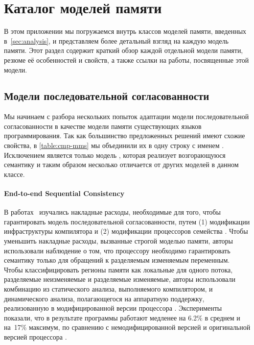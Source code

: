 \section{Каталог моделей памяти}
\label{sec:catalog}

В этом приложении мы погружаемся внутрь классов 
моделей памяти, введенных в~\cref{sec:analysis},
и представляем более детальный взгляд на каждую модель памяти.
Этот раздел содержит краткий обзор каждой отдельной модели памяти, 
резюме её особенностей и свойств, а также ссылки на работы, 
посвященные этой модели.   
 
\subsection{Модели последовательной согласованности}
\label{sec:catalog:sc}

Мы начинаем с разбора нескольких попыток 
адаптации модели последовательной согласованности 
в качестве модели памяти существующих языков программирования. 
Так как большинство предложенных решений имеют 
схожие свойства, в \cref{table:cmp-mms} 
мы объединили их в одну строку с именем \SC. 
Исключением является только модель \DRFx,
которая реализует возгорающуюся семантику 
и таким образом несколько отличается от других моделей в данном классе. 

\paragraph{End-to-end Sequential Consistency}

В работах~\cite{Marino-al:PLDI11, Singh-al:ISCA12} 
изучались накладные расходы, необходимые для того, 
чтобы гарантировать модель последовательной согласованности, 
путем (1) модификации инфраструктуры компилятора \LLVM и 
(2) модификации процессоров семейства \Intel.
Чтобы уменьшить накладные расходы, вызванные строгой моделью памяти, 
авторы использовали наблюдение о том, что 
процессору необходимо гарантировать семантику \SC 
только для обращений к разделяемым изменяемым переменным. 
Чтобы классифицировать регионы памяти как 
локальные для одного потока, разделяемые неизменяемые 
и разделяемые изменяемые, авторы использовали 
комбинацию из статического анализа, выполняемого компилятором, 
и динамического анализа, полагающегося на аппаратную поддержку, 
реализованную в модифицированной версии процессора \Intel. 
Эксперименты показали, что в результате программы 
работают медленее на 6.2\% в среднем и на~17\% максимум, 
по сравнению с немодифицированной версией \LLVM
и оригинальной версией процессора \Intel.

